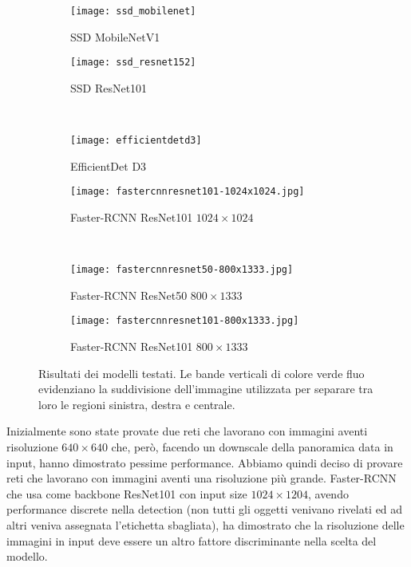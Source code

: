 \begin{figure}[t]
    \centering
    \hfill
    \begin{subfigure}[b]{0.49\textwidth}
        \centering
        \texttt{[image: ssd\_mobilenet]}
        \caption{SSD MobileNetV1}
    \end{subfigure}
    \hfill
    \begin{subfigure}[b]{0.49\textwidth}
        \centering
        \texttt{[image: ssd\_resnet152]}
        \caption{SSD ResNet101}
    \end{subfigure}
    \hfill \\
    \hfill
    \begin{subfigure}[b]{0.49\textwidth}
        \centering
        \texttt{[image: efficientdetd3]}
        \caption{EfficientDet D3}
    \end{subfigure}
    \hfill
    \begin{subfigure}[b]{0.49\textwidth}
        \centering
        \texttt{[image: fastercnnresnet101-1024x1024.jpg]}
        \caption{Faster-RCNN ResNet101 $1024\times 1024$}
    \end{subfigure}
    \hfill \\
    \hfill
    \begin{subfigure}[b]{0.49\textwidth}
        \centering
        \texttt{[image: fastercnnresnet50-800x1333.jpg]}
        \caption{Faster-RCNN ResNet50 $800\times 1333$}
    \end{subfigure}
    \hfill
    \begin{subfigure}[b]{0.49\textwidth}
        \centering
        \texttt{[image: fastercnnresnet101-800x1333.jpg]}
        \caption{Faster-RCNN ResNet101 $800\times 1333$}
    \end{subfigure}
    \hfill
    \caption{Risultati dei modelli testati. Le bande verticali di colore verde fluo evidenziano la suddivisione dell’immagine utilizzata per separare tra loro le regioni sinistra, destra e centrale.}
\end{figure}

Inizialmente sono state provate due reti che lavorano con immagini aventi risoluzione $640 \times 640$ che, però, facendo un downscale della panoramica data in input, hanno dimostrato pessime performance.
Abbiamo quindi deciso di provare reti che lavorano con immagini aventi una risoluzione più grande. Faster-RCNN che usa come backbone ResNet101 con input size $1024 \times 1204$, avendo performance discrete nella detection (non tutti gli oggetti venivano rivelati ed ad altri veniva assegnata l’etichetta sbagliata), ha dimostrato che la risoluzione delle immagini in input deve essere un altro fattore discriminante nella scelta del modello.

